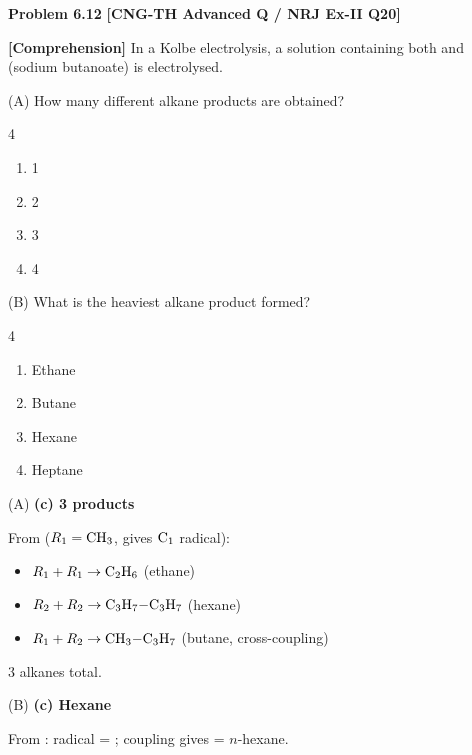 \begin{problembox}
\textbf{Problem 6.12} \hfill \textbf{[CNG-TH Advanced Q / NRJ Ex-II Q20]}

\textbf{[Comprehension]} In a Kolbe electrolysis, a solution containing both  and  (sodium butanoate) is electrolysed.

(A) How many different alkane products are obtained?
\begin{multicols}{4}
\begin{enumerate}[label=(\alph*)]
    \item 1
    \item 2
    \item 3
    \item 4
\end{enumerate}
\end{multicols}

(B) What is the heaviest alkane product formed?
\begin{multicols}{4}
\begin{enumerate}[label=(\alph*)]
    \item Ethane
    \item Butane
    \item Hexane
    \item Heptane
\end{enumerate}
\end{multicols}
\end{problembox}
\begin{solution}
(A) \textbf{(c) 3 products}

From  ($R_1 = \ce{CH3}$, gives $\ce{C1}$ radical):
\begin{itemize}
    \item $R_1 + R_1 \to \ce{C2H6}$ (ethane)
    \item $R_2 + R_2 \to \ce{C3H7-C3H7}$ (hexane)
    \item $R_1 + R_2 \to \ce{CH3-C3H7}$ (butane, cross-coupling)
\end{itemize}
3 alkanes total.

(B) \textbf{(c) Hexane}

From : radical = ; coupling gives  = $n$-hexane.
\end{solution}

